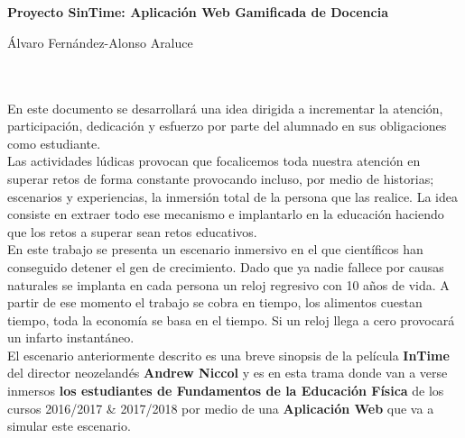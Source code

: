 \chapter*{}






\cleardoublepage
\thispagestyle{empty}

\begin{center}
{\large\bfseries Proyecto SinTime: Aplicación Web Gamificada de Docencia }\\
\end{center}
\begin{center}
Álvaro Fernández-Alonso Araluce\\
\end{center}

\\

\vspace{0.7cm}
\\

En este documento se desarrollará una idea dirigida a incrementar la atención, participación, dedicación y esfuerzo por parte del alumnado en sus obligaciones como estudiante.\\

Las actividades lúdicas provocan que focalicemos toda nuestra atención en superar retos de forma constante provocando incluso, por medio de historias; escenarios y experiencias, la inmersión total de la persona que las realice. La idea consiste en extraer todo ese mecanismo e implantarlo en la educación haciendo que los retos a superar sean retos educativos.\\

En este trabajo se presenta un escenario inmersivo en el que científicos han conseguido detener el gen de crecimiento. Dado que ya nadie fallece por causas naturales se implanta en cada persona un reloj regresivo con 10 años de vida. A partir de ese momento el trabajo se cobra en tiempo, los alimentos cuestan tiempo, toda la economía se basa en el tiempo. Si un reloj llega a cero provocará un infarto instantáneo.\\

El escenario anteriormente descrito es una breve sinopsis de la película \textbf{InTime} del director neozelandés \textbf{Andrew Niccol} y es en esta trama donde van a verse inmersos \textbf{los estudiantes de Fundamentos de la Educación Física} de los cursos 2016/2017 \& 2017/2018 por medio de una \textbf{Aplicación Web} que va a simular este escenario.\\


